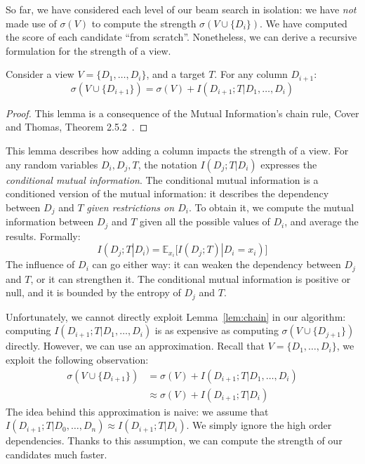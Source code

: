 So far, we have considered each level of our beam search in isolation: we have
\emph{not} made use of $\sigma(V)$ to compute the strength $\sigma(V \cup \{D_i\})$.
We have computed the score of each candidate ``from scratch''. Nonetheless, we
can derive a recursive formulation for the strength of a view. 
\begin{lemma}\label{lem:chain}
Consider a view $V = \{D_1, \ldots, D_i\}$, and a target $T$.
For any column $D_{i+1}$: 
\begin{equation}\label{eq:bonus}
\sigma(V \cup \{D_{i+1}\}) =  \sigma(V) + I(D_{i+1} ; T | D_1 , \ldots, D_i)
\end{equation}
\end{lemma}
\begin{proof}
This lemma is a consequence of the Mutual Information's chain rule,
Cover and Thomas, Theorem 2.5.2~\cite{cover2012elements}.
\end{proof}
This lemma describes how adding a column impacts the strength of a view.  For
any random variables $D_i,D_j,T$, the notation $I(D_j;T|D_i)$  expresses the
\emph{conditional mutual information}. The conditional mutual information is a
conditioned version of the mutual information: it describes the
dependency between $D_j$ and $T$ \emph{given restrictions on $D_i$}. To obtain
it, we compute the mutual information between $D_j$ and $T$ given all the
possible values of $D_i$, and average the results. Formally:
\begin{equation}\label{eq:condmutinfo}
    I(D_j;T|D_i) = \mathbb{E}_{x_i}\big[ I(D_j; T)| D_i = x_i)  \big]
\end{equation}
The influence of $D_i$ can go either way: it can weaken the dependency between
$D_j$ and $T$, or it can strengthen it. The conditional mutual information is
positive or null, and it is bounded by the entropy of $D_j$ and $T$. 

Unfortunately, we cannot directly exploit Lemma~\ref{lem:chain} in our
algorithm: computing $I(D_{i+1} ; T | D_1 , \ldots, D_i)$ is as expensive as
computing $\sigma(V \cup \{D_{j+1}\}) $ directly.  However, we can use an
approximation.  Recall that $V = \{D_1, \ldots, D_i\}$, we exploit the
following observation:
\begin{equation}\label{eq:approx}
\begin{split}
    \sigma(V \cup \{D_{i+1}\}) & = \sigma(V)   + I(D_{i+1} ; T | D_1, \ldots, D_{i})\\
                               & \approx \sigma(V) + I(D_{i+1} ; T | D_{i})
\end{split}
\end{equation}
The idea behind this approximation is naive: we assume that $I(D_{i+1} ; T |
D_0, \ldots, D_{n}) \approx I(D_{i+1} ; T | D_{i})$. We simply ignore the high
order dependencies. Thanks to this assumption, we can compute the strength of
our candidates much faster. 

